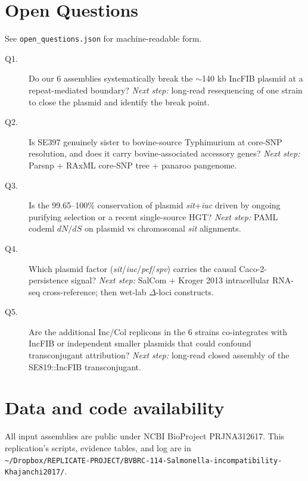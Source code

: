 \documentclass[10pt]{article}
\begin{document}
\section{Open Questions}
See \texttt{open\_questions.json} for machine-readable form.
\begin{description}
\item[Q1.] Do our 6 assemblies systematically break the $\sim$140 kb IncFIB plasmid at a repeat-mediated boundary? \emph{Next step:} long-read resequencing of one strain to close the plasmid and identify the break point.
\item[Q2.] Is SE397 genuinely sister to bovine-source Typhimurium at core-SNP resolution, and does it carry bovine-associated accessory genes? \emph{Next step:} Parsnp + RAxML core-SNP tree + panaroo pangenome.
\item[Q3.] Is the 99.65--100\% conservation of plasmid \emph{sit}+\emph{iuc} driven by ongoing purifying selection or a recent single-source HGT? \emph{Next step:} PAML codeml $dN/dS$ on plasmid vs chromosomal \emph{sit} alignments.
\item[Q4.] Which plasmid factor (\emph{sit}/\emph{iuc}/\emph{pef}/\emph{spv}) carries the causal Caco-2-persistence signal? \emph{Next step:} SalCom + Kroger 2013 intracellular RNA-seq cross-reference; then wet-lab $\Delta$-loci constructs.
\item[Q5.] Are the additional Inc/Col replicons in the 6 strains co-integrates with IncFIB or independent smaller plasmids that could confound transconjugant attribution? \emph{Next step:} long-read closed assembly of the SE819::IncFIB transconjugant.
\end{description}

\section*{Data and code availability}
All input assemblies are public under NCBI BioProject PRJNA312617. This replication's scripts, evidence tables, and log are in \\ \texttt{\textasciitilde/Dropbox/REPLICATE-PROJECT/BVBRC-114-Salmonella-incompatibility-Khajanchi2017/}.
\end{document}
